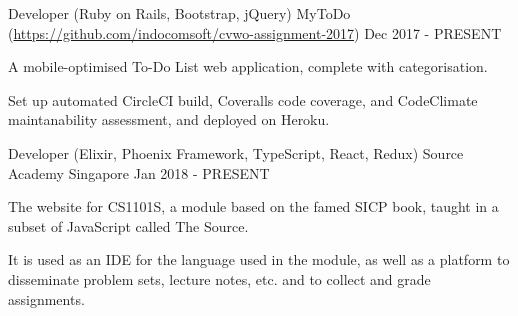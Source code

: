 

\begin{cventries}

	\cventry
		{Developer (Ruby on Rails, Bootstrap, jQuery)} %
		{MyToDo (\url{https://github.com/indocomsoft/cvwo-assignment-2017})} %
		{} %
		{Dec 2017 - PRESENT} %
		{
			\begin{cvitems} %
				\item {A mobile-optimised To-Do List web application, complete with categorisation.}
				\item {Set up automated CircleCI build, Coveralls code coverage, and CodeClimate maintanability assessment, and deployed on Heroku.}
			\end{cvitems}
		}
		
    
\cventry
    {Developer (Elixir, Phoenix Framework, TypeScript, React, Redux)} %
    {Source Academy} %
    {Singapore} %
    {Jan 2018 - PRESENT} %
    {
      \begin{cvitems} %
      	\item {The website for CS1101S, a module based on the famed SICP book, taught in a subset of JavaScript called The Source.}
      	\item {It is used as an IDE for the language used in the module, as well as a platform to disseminate problem sets, lecture notes, etc. and to collect and grade assignments.}
      \end{cvitems}
    }


\end{cventries}

